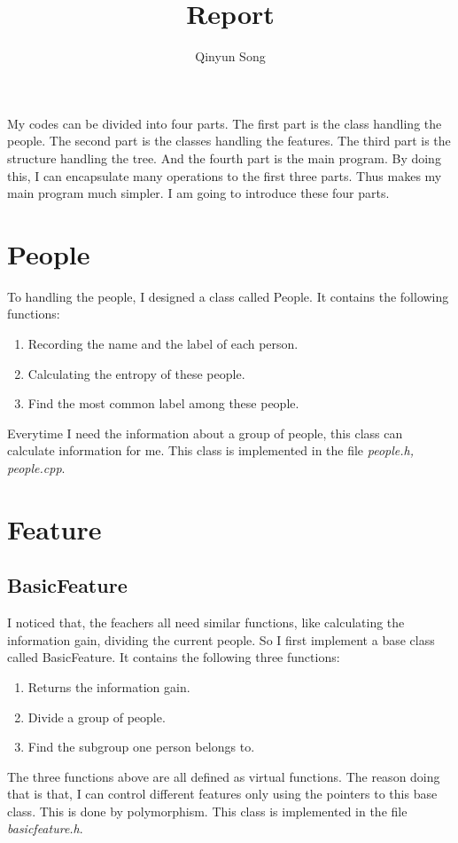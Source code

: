 \documentclass{article}
\title{Report}
\author{Qinyun Song}
\date{}
\begin{document}
	\maketitle
	
	My codes can be divided into four parts. The first part is the class handling the people. The second part is the classes handling the features. The third part is the structure handling the tree. And the fourth part is the main program. By doing this, I can encapsulate many operations to the first three parts. Thus makes my main program much simpler. I am going to introduce these four parts.
	
	\section{People}
		To handling the people, I designed a class called People. It contains the following functions:
		\begin{enumerate}
			\item Recording the name and the label of each person.
			\item Calculating the entropy of these people.
			\item Find the most common label among these people.
		\end{enumerate}
		Everytime I need the information about a group of people, this class can calculate information for me. \newline
		This class is implemented in the file \emph{people.h, people.cpp}.
	\section{Feature}
		\subsection{BasicFeature}
		I noticed that, the feachers all need similar functions, like calculating the information gain, dividing the current people. So I first implement a base class called BasicFeature. It contains the following three functions:
		\begin{enumerate}
			\item Returns the information gain.
			\item Divide a group of people.
			\item Find the subgroup one person belongs to.
		\end{enumerate}
		The three functions above are all defined as virtual functions. The reason doing that is that, I can control different features only using the pointers to this base class. This is done by polymorphism. \newline
		This class is implemented in the file \emph{basicfeature.h}.
\end{document}
